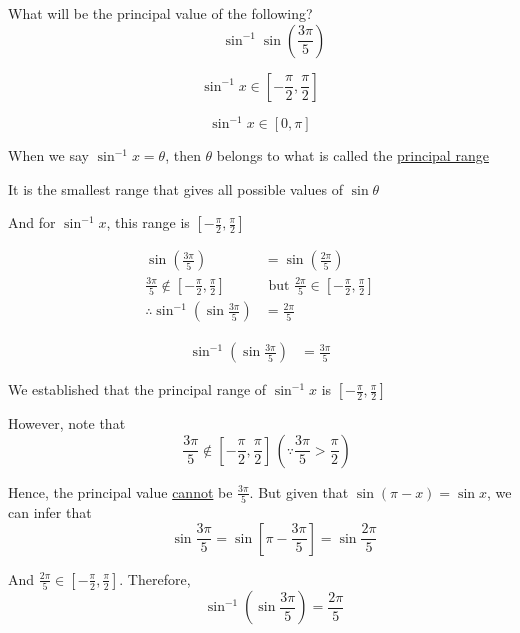 \documentclass[14pt,fleqn]{extarticle}
\newcommand\prange{\left[-\frac{\pi}{2}, \frac{\pi}{2} \right]}
\begin{document}
What will be the principal value of the following? 
\[\qquad  \sin^{-1}\sin\left(\frac{3\pi}{5}\right) \]
%

\newcard

\[ \sin^{-1} x \in \prange \]

\newcard 

\[ \sin^{-1} x \in \left[0,\pi\right] \]

\newcard 

When we say $\sin^{-1} x = \theta$, then $\theta$ belongs to what is called 
the \underline{principal range} \newline 

It is the smallest range that gives all possible values of $\sin\theta$\newline 

And for $\sin^{-1} x$, this range is $\prange$ 

\newcard 

\begin{align}
	\sin \left(\frac{3\pi}{5} \right) &= \sin \left(\frac{2\pi}{5} \right) \\
	\frac{3\pi}{5} \notin \prange &\text{ but } \frac{2\pi}{5}\in \prange \\
	\therefore \sin^{-1} \left(\sin \frac{3\pi}{5} \right) &= \frac{2\pi}{5}
\end{align}

\newcard 

\begin{align}
	\sin^{-1} \left(\sin \frac{3\pi}{5} \right) &= \frac{3\pi}{5} 
\end{align}
\newcard 

We established that the principal range of $\sin^{-1} x$ is $\prange$\newline 

However, note that 
\[ \quad \frac{3\pi}{5}\notin \prange\, \left(\because \frac{3\pi}{5} > \frac{\pi}{2} \right) \] 

Hence, the principal value \underline{cannot} be $\frac{3\pi}{5}$. But given that $\sin \left(\pi - x \right) = \sin x$, we can infer that 
\[ \qquad \sin \frac{3\pi}{5} = \sin \left[\pi - \frac{3\pi}{5} \right] = \sin \frac{2\pi}{5} \]

And $\frac{2\pi}{5}\in\prange$. Therefore, 
\[ \qquad \sin^{-1} \left(\sin \frac{3\pi}{5} \right) = \frac{2\pi}{5}\]
\end{document}
